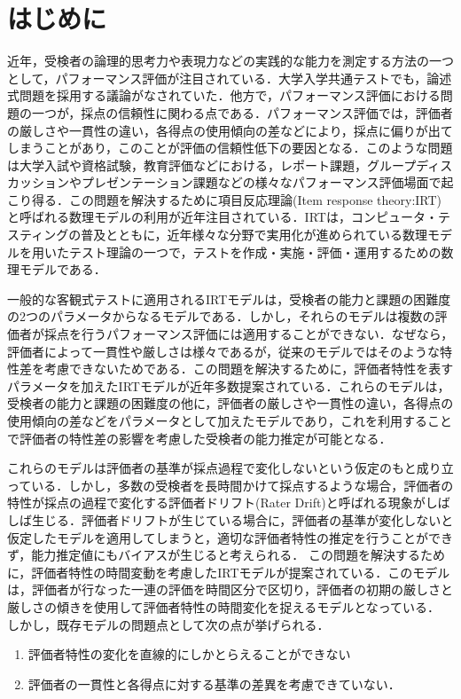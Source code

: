 \documentclass[a4paper,11pt,oneside,openany]{jsbook}
\begin{document}
\newpage
\chapter{はじめに}
近年，受検者の論理的思考力や表現力などの実践的な能力を測定する方法の一つとして，パフォーマンス評価が注目されている．大学入学共通テストでも，論述式問題を採用する議論がなされていた．他方で，パフォーマンス評価における問題の一つが，採点の信頼性に関わる点である．パフォーマンス評価では，評価者の厳しさや一貫性の違い，各得点の使用傾向の差などにより，採点に偏りが出てしまうことがあり，このことが評価の信頼性低下の要因となる．このような問題は大学入試や資格試験，教育評価などにおける，レポート課題，グループディスカッションやプレゼンテーション課題などの様々なパフォーマンス評価場面で起こり得る．この問題を解決するために項目反応理論(Item response theory:IRT)\cite{IRTtext,IRTLord}と呼ばれる数理モデルの利用が近年注目されている．IRTは，コンピュータ・テスティングの普及とともに，近年様々な分野で実用化が進められている数理モデルを用いたテスト理論の一つで，テストを作成・実施・評価・運用するための数理モデルである．

一般的な客観式テストに適用されるIRTモデルは，受検者の能力と課題の困難度の2つのパラメータからなるモデル\cite{rash}である．しかし，それらのモデルは複数の評価者が採点を行うパフォーマンス評価には適用することができない．なぜなら，評価者によって一貫性や厳しさは様々であるが，従来のモデルではそのような特性差を考慮できないためである．この問題を解決するために，評価者特性を表すパラメータを加えたIRTモデルが近年多数提案されている\cite{raterRash,rater2,rater3,Patz}．これらのモデルは，受検者の能力と課題の困難度の他に，評価者の厳しさや一貫性の違い，各得点の使用傾向の差などをパラメータとして加えたモデルであり，これを利用することで評価者の特性差の影響を考慮した受検者の能力推定が可能となる．

これらのモデルは評価者の基準が採点過程で変化しないという仮定のもと成り立っている．しかし，多数の受検者を長時間かけて採点するような場合，評価者の特性が採点の過程で変化する評価者ドリフト(Rater Drift)と呼ばれる現象がしばしば生じる．評価者ドリフトが生じている場合に，評価者の基準が変化しないと仮定したモデルを適用してしまうと，適切な評価者特性の推定を行うことができず，能力推定値にもバイアスが生じると考えられる．
この問題を解決するために，評価者特性の時間変動を考慮したIRTモデルが提案されている\cite{raterdrift}．このモデルは，評価者が行なった一連の評価を時間区分で区切り，評価者の初期の厳しさと厳しさの傾きを使用して評価者特性の時間変化を捉えるモデルとなっている．
しかし，既存モデルの問題点として次の点が挙げられる．
\begin{enumerate}
  \item 評価者特性の変化を直線的にしかとらえることができない
  \item 評価者の一貫性と各得点に対する基準の差異を考慮できていない．
\end{enumerate}  
\end{document}
